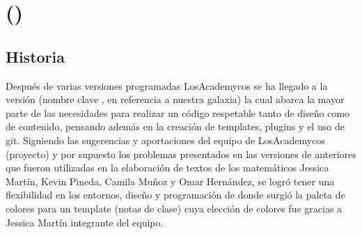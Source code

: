 {\justifying
\chapter[\printkeyname]{\printproject\space(\printkeyname)}
	\section{Historia}
	Después de varias versiones programadas LosAcademycos se ha llegado a la versión \printproject\space (nombre clave \printkeyname, en referencia a nuestra galaxia) la cual abarca la mayor parte de las necesidades para realizar un código respetable tanto de diseño como de contenido, pensando además en la creación de templates, plugins y el uso de git. 
	\pap 
	Siguiendo las sugerencias y aportaciones del equipo de LosAcademycos (proyecto) y por supuesto los problemas presentados en las versiones de anteriores que fueron utilizadas en la elaboración de textos de los matemáticos Jessica Martín, Kevin Pineda, Camila Muñoz y Omar Hernández, se logró tener una flexibilidad en los entornos, diseño y programación de donde surgió la paleta de colores para un template (notas de clase) cuya elección de colores fue gracias a Jessica Martín integrante del equipo. 
	\pap 
}
